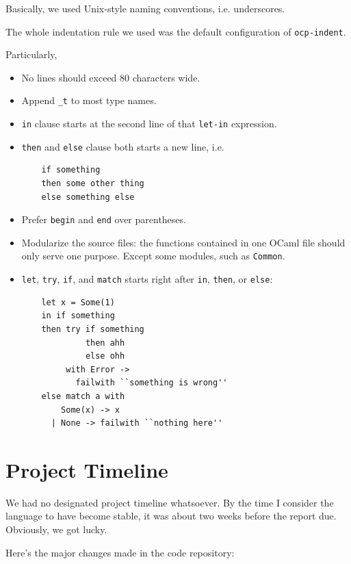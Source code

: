 \documentclass{report}
\begin{document}
Basically, we used Unix-style naming conventions, i.e. underscores.

The whole indentation rule we used was the default configuration of \texttt{ocp-indent}.

Particularly,

\begin{itemize}
\item No lines should exceed 80 characters wide.
\item Append \texttt{\_t} to most type names.
\item \texttt{in} clause starts at the second line of that
  \texttt{let-in} expression.
\item \texttt{then} and \texttt{else} clause both starts a new line, i.e.
  \begin{verbatim}
    if something
    then some other thing
    else something else
  \end{verbatim}
\item Prefer \texttt{begin} and \texttt{end} over parentheses.
\item Modularize the source files: the functions contained in one OCaml file should only serve one purpose. Except some modules, such as \texttt{Common}.
\item \texttt{let}, \texttt{try}, \texttt{if}, and \texttt{match} starts right after \texttt{in}, \texttt{then}, or \texttt{else}:
  \begin{verbatim}
    let x = Some(1)
    in if something
    then try if something
             then ahh
             else ohh
         with Error ->
           failwith ``something is wrong''
    else match a with
        Some(x) -> x
      | None -> failwith ``nothing here''
  \end{verbatim}
\end{itemize}

\section{Project Timeline}

We had no designated project timeline whatsoever. By the time I consider the language to have become stable, it was about two weeks before the report due. Obviously, we got lucky.

Here's the major changes made in the code repository:
\end{document}
